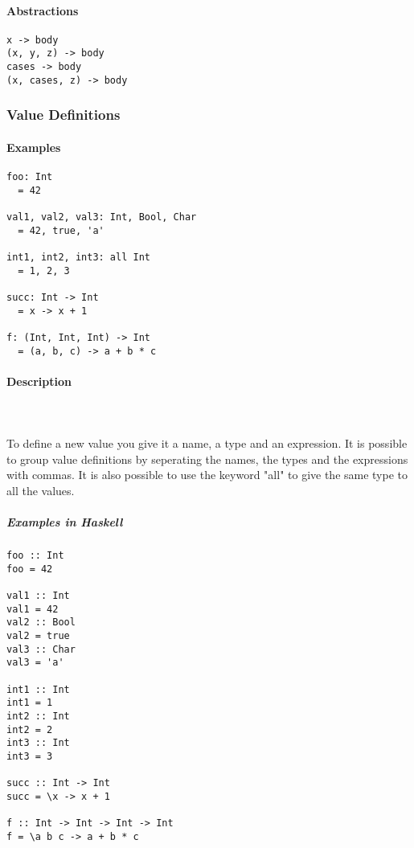 \documentclass{article}
\def\H{Haskell}
\begin{document}
\paragraph{Abstractions}

\begin{verbatim}
x -> body
(x, y, z) -> body
cases -> body
(x, cases, z) -> body
\end{verbatim}

\subsubsection{Value Definitions}

\paragraph{Examples}

\begin{verbatim}
foo: Int
  = 42

val1, val2, val3: Int, Bool, Char
  = 42, true, 'a'

int1, int2, int3: all Int
  = 1, 2, 3

succ: Int -> Int
  = x -> x + 1

f: (Int, Int, Int) -> Int
  = (a, b, c) -> a + b * c
\end{verbatim}

\paragraph{Description}\mbox{} \\\\
To define a new value you give it a name, a type and an expression. It is possible
to group value definitions by seperating the names, the types and the expressions
with commas. It is also possible to use the keyword "all" to give the same type
to all the values.

\subparagraph{Examples in \H}

\begin{verbatim}
foo :: Int
foo = 42

val1 :: Int
val1 = 42
val2 :: Bool
val2 = true
val3 :: Char
val3 = 'a'

int1 :: Int
int1 = 1
int2 :: Int
int2 = 2
int3 :: Int
int3 = 3

succ :: Int -> Int
succ = \x -> x + 1

f :: Int -> Int -> Int -> Int
f = \a b c -> a + b * c
\end{verbatim}
\end{document}
